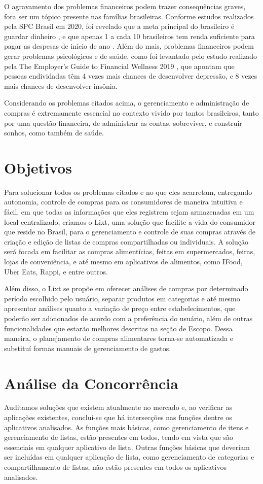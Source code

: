 O agravamento dos problemas financeiros podem trazer consequências graves, fora ser um tópico presente nas famílias brasileiras. Conforme estudos realizados pela SPC Brasil em 2020, foi revelado que a meta principal do brasileiro é guardar dinheiro \cite{MetaFinanceiraSPC}, e que apenas 1 a cada 10 brasileiros tem renda suficiente para pagar as despesas de início de ano \cite{DespesaSPC}. Além do mais, problemas financeiros podem gerar problemas psicológicos e de saúde, como foi levantado pelo estudo realizado pela The Employer’s Guide to Financial Wellness 2019 \cite{Endividados}, que apontam que pessoas endividadas têm 4 vezes mais chances de desenvolver depressão, e 8 vezes mais chances de desenvolver insônia.

Considerando os problemas citados acima, o gerenciamento e administração de compras é extremamente essencial no contexto vivido por tantos brasileiros, tanto por uma questão financeira, de administrar as contas, sobreviver, e construir sonhos, como também de saúde.

\label{sec:objetivos}
\section{Objetivos}
Para solucionar todos os problemas citados e no que eles acarretam, entregando autonomia, controle de compras para os consumidores de maneira intuitiva e fácil, em que todas as informações que eles registrem sejam armazenadas em um local centralizado, criamos o Lixt, uma solução que facilite a vida do consumidor que reside no Brasil, para o gerenciamento e controle de suas compras através de criação e edição de listas de compras compartilhadas ou individuais. A solução será focada em facilitar as compras alimentícias, feitas em supermercados, feiras, lojas de conveniência, e até mesmo em aplicativos de alimentos, como IFood, Uber Eats, Rappi, e entre outros.

Além disso, o Lixt se propõe em oferecer análises de compras por determinado período escolhido pelo usuário, separar produtos em categorias e até mesmo apresentar análises quanto a variação de preço entre estabelecimentos, que poderão ser adicionados de acordo com a preferência do usuário, além de outras funcionalidades que estarão melhores descritas na seção de Escopo. Dessa maneira, o planejamento de compras alimentares torna-se automatizada e substituí formas manuais de gerenciamento de gastos.

\label{sec:analiseconcorrencia}
\section{Análise da Concorrência}
Auditamos soluções que existem atualmente no mercado e, ao verificar as aplicações existentes, conclui-se que há intersecções nas funções dentre os aplicativos analisados. As funções mais básicas, como gerenciamento de itens e gerenciamento de listas, estão presentes em todos, tendo em vista que são essenciais em qualquer aplicativo de
lista. Outras funções básicas que deveriam ser incluídas em qualquer aplicação de lista, como gerenciamento de categorias e
compartilhamento de listas, não estão presentes em todos os
aplicativos analisados.

